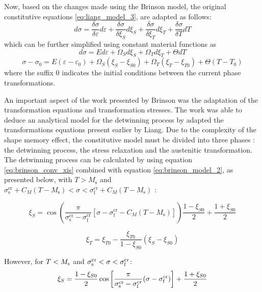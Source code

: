 Now, based on the changes made using the Brinson model, the original constitutive equations \cref{eq:liang_model_3}, are adapted as follows:
\begin{equation}
  \label{eq:brinson_model_1}
  d\sigma = \frac{\delta\sigma}{\delta\varepsilon}d\varepsilon + \frac{\delta\sigma}{\delta\xi_S}d\xi_S + \frac{\delta\sigma}{\delta\xi_T}d\xi_T + \frac{\delta\sigma}{\delta T}dT
\end{equation}
 which can be further simplified using constant material functions as
\begin{equation}
  \label{eq:brinson_model_2}
  d\sigma = Ed\varepsilon + \Omega_Sd\xi_S + \Omega_Td\xi_T + \Theta dT
\end{equation}
\begin{equation}
  \label{eq:brinson_model_3}
  \sigma-\sigma_0 = E(\varepsilon-\varepsilon_0) + \Omega_S(\xi_S-\xi_{S0}) + \Omega_T(\xi_T-\xi_{T0}) + \Theta (T-T_0)
\end{equation}
where the suffix $0$ indicates the initial conditions between the current phase transformations.

An important aspect of the work presented by Brinson was the adaptation of the transformation equations and transformation stresses. The work was able to deduce an analytical model for the detwinning process by adapted the transformations equations present earlier by Liang. Due to the complexity of the shape memory effect, the constitutive model must be divided into three phases : the detwinning process, the stress relaxation and the austenitic transformation. The detwinning process can be calculated by using equation \ref{eq:brinson_conv_xis} combined with equation \ref{eq:brinson_model_2}, as presented below, with $T > M_\mathrm{s}$ and $\sigma_\mathrm{s}^\mathrm{cr} + C_M(T - M_\mathrm{s}) < \sigma < \sigma_\mathrm{f}^\mathrm{cr} + C_M(T-M_\mathrm{s})$ :

\begin{equation}
  \label{eq:brinson_conv_xis}
  \xi_S = \cos\left(\frac{\pi}{\sigma_\mathrm{s}^\mathrm{cr}-\sigma_\mathrm{f}^\mathrm{cr}}[\sigma - \sigma_\mathrm{f}^\mathrm{cr} - C_M(T-M_\mathrm{s})]\right)\frac{1-\xi_{S0}}{2} + \frac{1+\xi_{S0}}{2}
\end{equation}

\begin{equation}
  \label{eq:brinson_conv_xit}
  \xi_T = \xi_{T0} - \frac{\xi_{T0}}{1-\xi_{S0}}(\xi_S-\xi_{S0})
\end{equation}

However, for $T<M_\mathrm{s}$ and $\sigma_\mathrm{s}^\mathrm{cr}<\sigma<\sigma_\mathrm{f}^\mathrm{cr}$:
\begin{equation}
  \label{eq:brinson_conv_xis1}
  \xi_S = \frac{1-\xi_{S0}}{2}\cos\left[\frac{\pi}{\sigma_\mathrm{s}^\mathrm{cr}-\sigma_\mathrm{f}^\mathrm{cr}}(\sigma - \sigma_\mathrm{f}^\mathrm{cr})\right] + \frac{1+\xi_{S0}}{2}
\end{equation}

